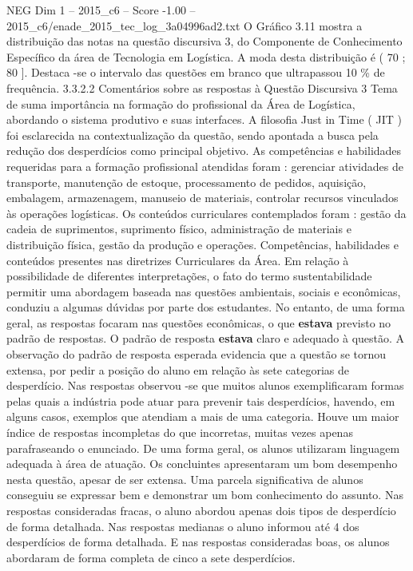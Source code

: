 \begin{textsample}{NEG Dim 1 – 2015\_c6 – Score -1.00 – 2015\_c6/enade\_2015\_tec\_log\_3a04996ad2.txt}
O Gráfico 3.11 mostra a distribuição das notas na questão discursiva 3, do Componente de Conhecimento Específico da área de Tecnologia em Logística.
A moda desta distribuição é ( 70 ; 80 ].
Destaca -se o intervalo das questões em branco que ultrapassou 10 \% de frequência. 3.3.2.2 Comentários sobre as respostas à Questão Discursiva 3 Tema de suma importância na formação do profissional da Área de Logística, abordando o sistema produtivo e suas interfaces.
A filosofia Just in Time ( JIT ) foi esclarecida na contextualização da questão, sendo apontada a busca pela redução dos desperdícios como principal objetivo.
As competências e habilidades requeridas para a formação profissional atendidas foram : gerenciar atividades de transporte, manutenção de estoque, processamento de pedidos, aquisição, embalagem, armazenagem, manuseio de materiais, controlar recursos vinculados às operações logísticas.
Os conteúdos curriculares contemplados foram : gestão da cadeia de suprimentos, suprimento físico, administração de materiais e distribuição física, gestão da produção e operações.
Competências, habilidades e conteúdos presentes nas diretrizes Curriculares da Área.
Em relação à possibilidade de diferentes interpretações, o fato do termo sustentabilidade permitir uma abordagem baseada nas questões ambientais, sociais e econômicas, conduziu a algumas dúvidas por parte dos estudantes.
No entanto, de uma forma geral, as respostas focaram nas questões econômicas, o que \textbf{estava} previsto no padrão de respostas.
O padrão de resposta \textbf{estava} claro e adequado à questão.
A observação do padrão de resposta esperada evidencia que a questão se tornou extensa, por pedir a posição do aluno em relação às sete categorias de desperdício.
Nas respostas observou -se que muitos alunos exemplificaram formas pelas quais a indústria pode atuar para prevenir tais desperdícios, havendo, em alguns casos, exemplos que atendiam a mais de uma categoria.
Houve um maior índice de respostas incompletas do que incorretas, muitas vezes apenas parafraseando o enunciado.
De uma forma geral, os alunos utilizaram linguagem adequada à área de atuação.
Os concluintes apresentaram um bom desempenho nesta questão, apesar de ser extensa.
Uma parcela significativa de alunos conseguiu se expressar bem e demonstrar um bom conhecimento do assunto.
Nas respostas consideradas fracas, o aluno abordou apenas dois tipos de desperdício de forma detalhada.
Nas respostas medianas o aluno informou até 4 dos desperdícios de forma detalhada.
E nas respostas consideradas boas, os alunos abordaram de forma completa de cinco a sete desperdícios.

\end{textsample}
